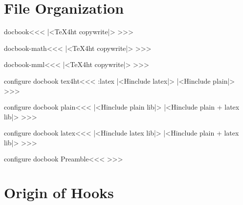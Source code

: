 %

\ifx \HTML\UnDef
   \def\HTML{docbook,docbook-math,docbook-mml}                         
   \def\CONFIG{\jobname}
   \def\MAKETITLE{\title{Source for DocBook}%
                  \author{Eitan M. Gurari}}   
   \def\PREAMBLE{\usepackage{url}}
   \def\next{  \endinput}
   \expandafter\next
\fi




\chapter{File Organization}



\<docbook\><<<
|<TeX4ht copywrite|>
>>>


\<docbook-math\><<<
|<TeX4ht copywrite|>
>>>


\<docbook-mml\><<<
|<TeX4ht copywrite|>
>>>


\<configure docbook tex4ht\><<<
\if:latex  |<Hinclude latex|>
\else      |<Hinclude plain|>  \fi
>>>

\<configure docbook plain\><<<
|<Hinclude plain lib|>
|<Hinclude plain + latex lib|>
>>>

\<configure docbook latex\><<<
|<Hinclude latex lib|>
|<Hinclude plain + latex lib|>
>>>

\<configure docbook Preamble\><<<    
\edef\Preamble{\Preamble,refcaption}
>>>


\chapter{Origin of Hooks}

